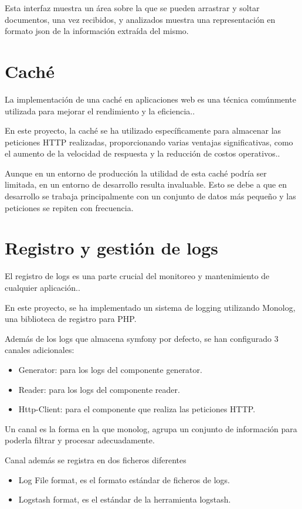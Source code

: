 Esta interfaz muestra un área sobre la que se pueden arrastrar y soltar documentos, una vez recibidos, y analizados
muestra una representación en formato json de la información extraída del mismo.


\section{Caché}
La implementación de una caché en aplicaciones web es una técnica comúnmente utilizada para mejorar el rendimiento y la
eficiencia..

En este proyecto, la caché se ha utilizado específicamente para almacenar las peticiones HTTP realizadas, proporcionando
varias ventajas significativas, como el aumento de la velocidad de respuesta y la reducción de costos operativos..

Aunque en un entorno de producción la utilidad de esta caché podría ser limitada, en un entorno de desarrollo resulta
invaluable. Esto se debe a que en desarrollo se trabaja principalmente con un conjunto de datos más pequeño y las
peticiones se repiten con frecuencia.


\section{Registro y gestión de logs}
El registro de logs es una parte crucial del monitoreo y mantenimiento de cualquier aplicación..

En este proyecto, se ha implementado un sistema de logging utilizando Monolog, una biblioteca de registro para PHP.

Además de los logs que almacena symfony por defecto, se han configurado 3 canales adicionales:

\begin{itemize}
    \item Generator: para los logs del componente generator.
    \item Reader: para los logs del componente reader.
    \item Http-Client: para el componente que realiza las peticiones HTTP.
\end{itemize}

Un canal es la forma en la que monolog, agrupa un conjunto de información para poderla filtrar y procesar adecuadamente.

Canal además se registra en dos ficheros diferentes

\begin{itemize}
    \item Log File format, es el formato estándar de ficheros de logs.
    \item Logstash format, es el estándar de la herramienta logstash.
\end{itemize}

